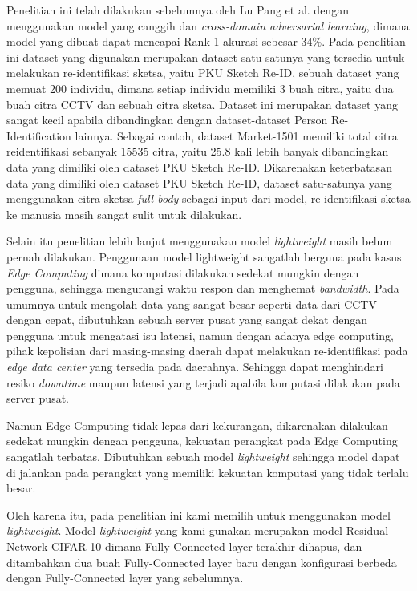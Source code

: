 Penelitian ini telah dilakukan sebelumnya oleh Lu Pang et al. dengan menggunakan model yang canggih dan \textit{cross-domain adversarial learning}, dimana model yang dibuat dapat mencapai Rank-1 akurasi sebesar 34\%. Pada penelitian ini dataset yang digunakan merupakan dataset satu-satunya yang tersedia untuk melakukan re-identifikasi sketsa, yaitu PKU Sketch Re-ID, sebuah dataset yang memuat 200 individu, dimana setiap individu memiliki 3 buah citra, yaitu dua buah citra CCTV dan sebuah citra sketsa. Dataset ini merupakan dataset yang sangat kecil apabila dibandingkan dengan dataset-dataset Person Re-Identification lainnya. Sebagai contoh, dataset Market-1501 memiliki total citra reidentifikasi sebanyak 15535 citra, yaitu 25.8 kali lebih banyak dibandingkan data yang dimiliki oleh dataset PKU Sketch Re-ID. Dikarenakan keterbatasan data yang dimiliki oleh dataset PKU Sketch Re-ID, dataset satu-satunya yang menggunakan citra sketsa \textit{full-body} sebagai input dari model, re-identifikasi sketsa ke manusia masih sangat sulit untuk dilakukan. 

Selain itu penelitian lebih lanjut menggunakan model \textit{lightweight} masih belum pernah dilakukan. Penggunaan model lightweight sangatlah berguna pada kasus \textit{Edge Computing} dimana komputasi dilakukan sedekat mungkin dengan pengguna, sehingga mengurangi waktu respon dan menghemat \textit{bandwidth}. Pada umumnya untuk mengolah data yang sangat besar seperti data dari CCTV dengan cepat, dibutuhkan sebuah server pusat yang sangat dekat dengan pengguna untuk mengatasi isu latensi, namun dengan adanya edge computing, pihak kepolisian dari masing-masing daerah dapat melakukan re-identifikasi pada \textit{edge data center} yang tersedia pada daerahnya. Sehingga dapat menghindari resiko \textit{downtime} maupun latensi yang terjadi apabila komputasi dilakukan pada server pusat.

\pagebreak

Namun Edge Computing tidak lepas dari kekurangan, dikarenakan dilakukan sedekat mungkin dengan pengguna, kekuatan perangkat pada Edge Computing sangatlah terbatas. Dibutuhkan sebuah model \textit{lightweight} sehingga model dapat di jalankan pada perangkat yang memiliki kekuatan komputasi yang tidak terlalu besar. 

Oleh karena itu, pada penelitian ini kami memilih untuk menggunakan model \textit{lightweight}. Model \textit{lightweight} yang kami gunakan merupakan model Residual Network CIFAR-10 dimana Fully Connected layer terakhir dihapus, dan ditambahkan dua buah Fully-Connected layer baru dengan konfigurasi berbeda dengan Fully-Connected layer yang sebelumnya. 

